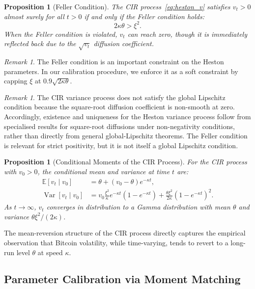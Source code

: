 \documentclass[12pt, a4paper, oneside]{report}
\theoremstyle{plain}
\newtheorem{proposition}[theorem]{Proposition}
\theoremstyle{definition}
\theoremstyle{remark}
\newtheorem{remark}[theorem]{Remark}
\newcommand{\E}{\mathbb{E}}
\newcommand{\Var}{\operatorname{Var}}
\begin{document}
\begin{proposition}[Feller Condition]
\label{prop:feller}
The CIR process~\eqref{eq:heston_v} satisfies $v_t > 0$ almost surely for all
$t > 0$ if and only if the Feller condition holds:
\[
  2\kappa\theta > \xi^2.
\]
When the Feller condition is violated, $v_t$ can reach zero, though it is
immediately reflected back due to the $\sqrt{v_t}$ diffusion coefficient.
\end{proposition}

\begin{remark}
The Feller condition is an important constraint on the Heston parameters.
In our calibration procedure, we enforce it as a soft constraint by capping
$\xi$ at $0.9\sqrt{2\kappa\theta}$.
\end{remark}

\begin{remark}
The CIR variance process does not satisfy the global Lipschitz condition
because the square-root diffusion coefficient is non-smooth at zero.
Accordingly, existence and uniqueness for the Heston variance process follow
from specialised results for square-root diffusions under non-negativity
conditions, rather than directly from general global-Lipschitz theorems.
The Feller condition is relevant for strict positivity, but it is not itself a
global Lipschitz condition.
\end{remark}

\begin{proposition}[Conditional Moments of the CIR Process]
\label{prop:cir_moments}
For the CIR process with $v_0 > 0$, the conditional mean and variance at time $t$ are:
\begin{align}
  \E[v_t \mid v_0] &= \theta + (v_0 - \theta)e^{-\kappa t}, \\
  \Var[v_t \mid v_0] &= v_0\frac{\xi^2}{\kappa}e^{-\kappa t}(1 - e^{-\kappa t})
    + \frac{\theta\xi^2}{2\kappa}(1 - e^{-\kappa t})^2.
\end{align}
As $t \to \infty$, $v_t$ converges in distribution to a Gamma distribution with
mean $\theta$ and variance $\theta\xi^2/(2\kappa)$.
\end{proposition}

The mean-reversion structure of the CIR process directly captures the empirical
observation that Bitcoin volatility, while time-varying, tends to revert to a
long-run level $\theta$ at speed $\kappa$.

\subsection{Parameter Calibration via Moment Matching}
\end{document}
